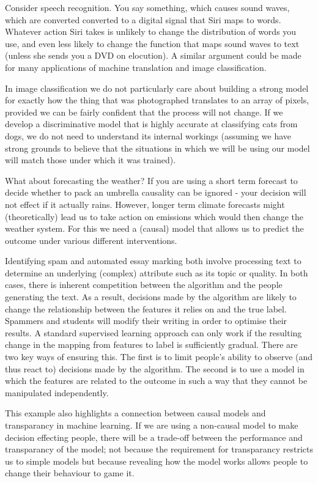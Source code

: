 \documentclass[11pt,a4paper,oneside]{book}
\theoremstyle{plain}
\theoremstyle{definition}
\begin{document}
Consider speech recognition. You say something, which causes sound waves, which are converted converted to a digital signal that Siri maps to words. Whatever action Siri takes is unlikely to change the distribution of words you use, and even less likely to change the function that maps sound waves to text (unless she sends you a DVD on elocution). A similar argument could be made for many applications of machine translation and image classification. 

In image classification we do not particularly care about building a strong model for exactly how the thing that was photographed translates to an array of pixels, provided we can be fairly confident that the process will not change. If we develop a discriminative model that is highly accurate at classifying cats from dogs, we do not need to understand its internal workings (assuming we have strong grounds to believe that the situations in which we will be using our model will match those under which it was trained).

What about forecasting the weather? If you are using a short term forecast to decide whether to pack an umbrella  causality can be ignored - your decision will not effect if it actually rains. However, longer term climate forecasts might (theoretically) lead us to take action on emissions which would then change the weather system. For this we need a (causal) model that allows us to predict the outcome under various different interventions.

Identifying spam and automated essay marking both involve  processing text to determine an underlying (complex) attribute such as its topic or quality. In both cases, there is inherent competition between the algorithm and the people generating the text. As a result, decisions made by the algorithm are likely to change the relationship between the features it relies on and the true label. Spammers and students will modify their writing in order to optimise their results. A standard supervised learning approach can only work if the resulting change in the mapping from features to label is sufficiently gradual. There are two key ways of ensuring this. The first is to limit people's ability to observe (and thus react to) decisions made by the algorithm. The second is to use a model in which the features are related to the outcome in such a way that they cannot be manipulated independently. 

This example also highlights a connection between causal models and transparancy in machine learning. If we are using a non-causal model to make decision effecting people, there will be a trade-off between the performance and transparancy of the model; not because the requirement for transparancy restricts us to simple models but because revealing how the model works allows people to change their behaviour to game it. 
\end{document}
